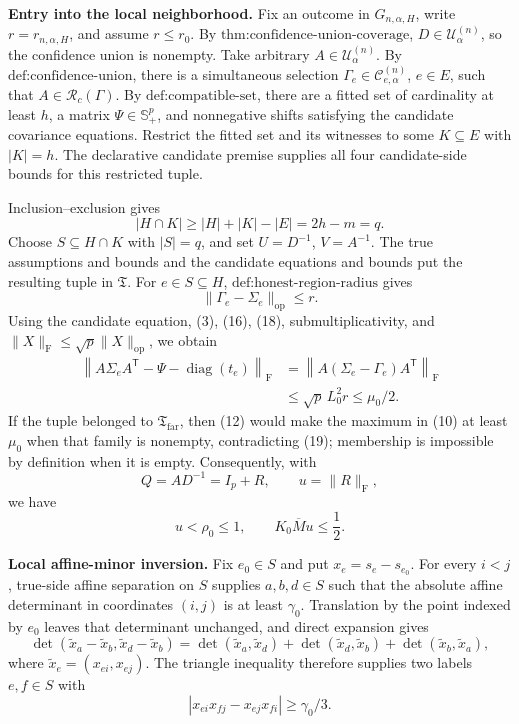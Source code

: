 \textbf{Entry into the local neighborhood.}
Fix an outcome in \(G_{n,\alpha,H}\), write \(r=r_{n,\alpha,H}\), and assume \(r\leq r_0\). By \(\text{thm:confidence-union-coverage}\), \(D\in\mathcal U^{(n)}_\alpha\), so the confidence union is nonempty. Take arbitrary \(A\in\mathcal U^{(n)}_\alpha\). By \(\text{def:confidence-union}\), there is a simultaneous selection \(\Gamma_e\in\mathcal C^{(n)}_{e,\alpha}\), \(e\in E\), such that \(A\in\mathcal R_c(\Gamma)\). By \(\text{def:compatible-set}\), there are a fitted set of cardinality at least \(h\), a matrix \(\Psi\in\mathbb S_+^p\), and nonnegative shifts satisfying the candidate covariance equations. Restrict the fitted set and its witnesses to some \(K\subseteq E\) with \(|K|=h\). The declarative candidate premise supplies all four candidate-side bounds for this restricted tuple.

Inclusion--exclusion gives
\[
|H\cap K|\geq|H|+|K|-|E|=2h-m=q.
\tag{17}
\]
Choose \(S\subseteq H\cap K\) with \(|S|=q\), and set \(U=D^{-1}\), \(V=A^{-1}\). The true assumptions and bounds and the candidate equations and bounds put the resulting tuple in \(\mathfrak T\). For \(e\in S\subseteq H\), \(\text{def:honest-region-radius}\) gives
\[
\|\Gamma_e-\Sigma_e\|_{\mathrm{op}}\leq r.
\tag{18}
\]
Using the candidate equation, (3), (16), (18), submultiplicativity, and \(\|X\|_{\mathrm F}\leq\sqrt p\|X\|_{\mathrm{op}}\), we obtain
\[
\begin{aligned}
\left\|A\Sigma_eA^{\mathsf T}
-\Psi-\operatorname{diag}(t_e)\right\|_{\mathrm F}
&=\left\|A(\Sigma_e-\Gamma_e)A^{\mathsf T}\right\|_{\mathrm F}\\
&\leq\sqrt p\,L_0^2r
\leq\mu_0/2.
\end{aligned}
\tag{19}
\]
If the tuple belonged to \(\mathfrak T_{\mathrm{far}}\), then (12) would make the maximum in (10) at least \(\mu_0\) when that family is nonempty, contradicting (19); membership is impossible by definition when it is empty. Consequently, with
\[
Q=AD^{-1}=I_p+R,
\qquad
u=\|R\|_{\mathrm F},
\]
we have
\[
u<\rho_0\leq1,
\qquad
K_0\overline M u\leq\frac12.
\tag{20}
\]

\textbf{Local affine-minor inversion.}
Fix \(e_0\in S\) and put \(x_e=s_e-s_{e_0}\). For every \(i<j\), true-side affine separation on \(S\) supplies \(a,b,d\in S\) such that the absolute affine determinant in coordinates \((i,j)\) is at least \(\gamma_0\). Translation by the point indexed by \(e_0\) leaves that determinant unchanged, and direct expansion gives
\[
\det(\widetilde x_a-\widetilde x_b,
\widetilde x_d-\widetilde x_b)
=\det(\widetilde x_a,\widetilde x_d)
+\det(\widetilde x_d,\widetilde x_b)
+\det(\widetilde x_b,\widetilde x_a),
\tag{21}
\]
where \(\widetilde x_e=(x_{ei},x_{ej})\). The triangle inequality therefore supplies two labels \(e,f\in S\) with
\[
|x_{ei}x_{fj}-x_{ej}x_{fi}|\geq\gamma_0/3.
\tag{22}
\]

